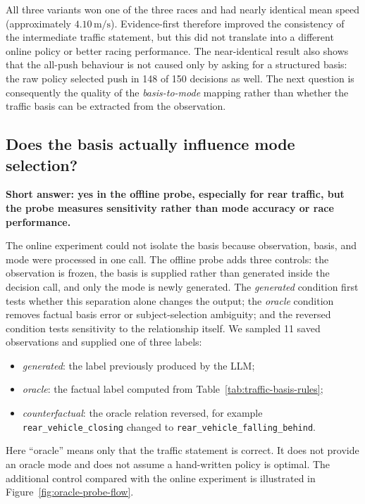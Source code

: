 \documentclass[11pt]{article}
\newcommand{\code}[1]{\texttt{#1}}
\begin{document}
All three variants won one of the three races and had nearly identical mean
speed (approximately $4.10\,\mathrm{m/s}$). Evidence-first therefore improved
the consistency of the intermediate traffic statement, but this did not
translate into a different online policy or better racing performance. The
near-identical result also shows that the all-push behaviour is not caused only
by asking for a structured basis: the raw policy selected push in 148 of 150
decisions as well. The next question is consequently the quality of the
\emph{basis-to-mode} mapping rather than whether the traffic basis can be
extracted from the observation.

\subsection{Does the basis actually influence mode selection?}

\noindent\textbf{Short answer: yes in the offline probe, especially for rear
traffic, but the probe measures sensitivity rather than mode accuracy or race
performance.}

The online experiment could not isolate the basis because observation, basis,
and mode were processed in one call. The offline probe adds three controls: the
observation is frozen, the basis is supplied rather than generated inside the
decision call, and only the mode is newly generated. The \emph{generated}
condition first tests whether this separation alone changes the output; the
\emph{oracle} condition removes factual basis error or subject-selection
ambiguity; and the reversed condition tests sensitivity to the relationship
itself. We sampled 11 saved observations and supplied one of three labels:

\begin{itemize}
  \item \emph{generated}: the label previously produced by the LLM;
  \item \emph{oracle}: the factual label computed from
  Table~\ref{tab:traffic-basis-rules};
  \item \emph{counterfactual}: the oracle relation reversed, for example
  \code{rear\_vehicle\_closing} changed to
  \code{rear\_vehicle\_falling\_behind}.
\end{itemize}

Here ``oracle'' means only that the traffic statement is correct. It does not
provide an oracle mode and does not assume a hand-written policy is optimal.
The additional control compared with the online experiment is illustrated in
Figure~\ref{fig:oracle-probe-flow}.
\end{document}

